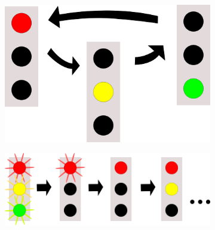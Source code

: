 \label{led-anzeige}
\begin{figure}
  \centering
  \begin{subfigure}[b]{0.22\textwidth}
    \includegraphics[width=\textwidth,keepaspectratio]
                    {./040-komponenten/010-hardware/led-default.png}
    \caption{\label{fig:led-init}}
  \end{subfigure}
  \hspace{0.1\textwidth}
  \begin{subfigure}[b]{0.40\textwidth}
    \includegraphics[width=\textwidth,keepaspectratio]{./040-komponenten/010-hardware/led-start.png}
    \caption{\label{fig:led-start}}
  \end{subfigure}
  

\end{figure}
